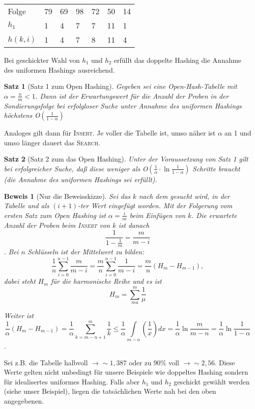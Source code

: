 \documentclass[ngerman,draft,parskip=half*,twoside]{scrreprt}
\theoremstyle{break}
\newtheorem{beweis}{Beweis}
\newtheorem{satz}{Satz}
\begin{document}
\begin{tabular}{lllllll}
Folge & 79 & 69 & 98 & 72 & 50 & 14\\
$h_1$ & 1 & 4 & 7 & 7 & 11 & 1\\
$h(k,i)$ & 1 & 4 & 7 & 8 & 11 & 4\\
\end{tabular}

Bei geschickter Wahl von $h_1$ und $h_2$ erfüllt das doppelte Hashing die Annahme des uniformen Hashings ausreichend.
 
\begin{satz}[Satz 1 zum Open Hashing]
Gegeben sei eine Open-Hash-Tabelle mit $\alpha=\frac{n}{m}<1$. Dann ist der Erwartungswert für die Anzahl der Proben in
der Sondierungsfolge bei erfolgloser Suche unter Annahme des uniformen Hashings höchstens
O$\left(\frac{1}{1-\alpha}\right)$
\end{satz}
Analoges gilt dann für \textsc{Insert}. Je voller die Tabelle ist, umso näher ist $\alpha$ an 1 und umso länger
dauert das \textsc{Search}.

\begin{satz}[Satz 2 zum das Open Hashing]
Unter der Voraussetzung von Satz 1 gilt bei erfolgreicher Suche, daß diese weniger als O$\left(\frac{1}{\alpha} \cdot
\ln{\frac{1}{1-\alpha}}\right)$ Schritte braucht (die Annahme des uniformen Hashings sei erfüllt).
\end{satz}

\begin{beweis}[Nur die Beweisskizze]
Sei das $k$ nach dem gesucht wird, in der Tabelle und als $(i+1)$-ter Wert eingefügt worden. Mit der Folgerung vom
ersten Satz zum Open Hashing ist $\alpha=\frac{i}{m}$ beim Einfügen von $k$. Die erwartete Anzahl der Proben beim
\textsc{Insert} von $k$ ist danach \[\frac{1}{1-\frac{1}{m}}=\frac{m}{m-i}\]
. Bei $n$ Schlüsseln ist der Mittelwert zu bilden: 
\[\frac{1}{n} \sum_{i=0}^{n-1} \frac{m}{m-i}=\frac{m}{n} \sum_{i=0}^{n-1}
\frac{1}{m-i}=\frac{m}{n}\left(H_m-H_{m-1}\right),\] dabei steht $H_m$ für die harmonische Reihe und es ist
\[H_m=\sum_{mu}^{m}\frac{1}{\mu}\]

Weiter ist
\[\frac{1}{\alpha}\left(H_m-H_{m-1}\right)=\frac{1}{\alpha} \sum_{k=m-n+1}^m \frac{1}{k} \leq \frac{1}{\alpha}\int
\limits_{m-n}
\left(\frac{1}{x}\right)dx=\frac{1}{\alpha} \ln{\frac{m}{m-n}}=\frac{1}{\alpha}\ln{\frac{1}{1-\alpha}}\].
\end{beweis}

Sei z.B. die Tabelle halbvoll $\rightarrow \sim 1,387$ oder zu 90\% voll $\rightarrow \sim 2,56$. Diese Werte gelten
nicht unbedingt für unsere Beispiele wie doppeltes Hashing sondern für idealisertes uniformes Hashing. Falls aber
$h_1$ und $h_2$ geschickt gewählt werden (siehe unser Beispiel), liegen die tatsächlichen Werte nah bei den oben
angegebenen. 
\end{document}
